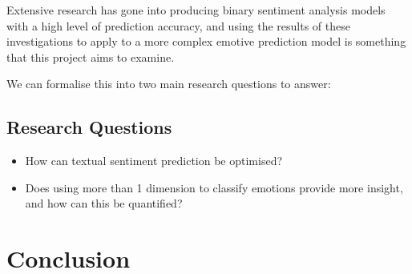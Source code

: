 \documentclass{article}
\begin{document}
Extensive research has gone into producing binary sentiment analysis models with a high level of prediction accuracy, and using the results of these investigations to apply to a more complex emotive prediction model is something that this project aims to examine.


We can formalise this into two main research questions to answer:

\subsection{Research Questions}
\begin{itemize}
    \item How can textual sentiment prediction be optimised?
    \item Does using more than 1 dimension to classify emotions provide more insight, and how can this be quantified?
\end{itemize}




\section{Conclusion}

\pagebreak






\end{document}
